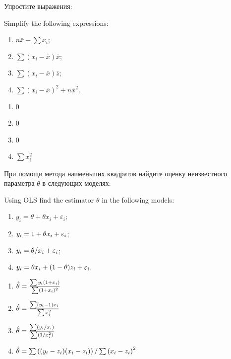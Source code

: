 \begin{problem}
\begin{translation-ru}
    Упростите выражения:    
\end{translation-ru}
\begin{translation-en}
    Simplify the following expressions:    
\end{translation-en}
\begin{enumerate}
\item $n\bar x - \sum x_i$;
\item $\sum (x_i - \bar x)\bar x$;
\item $\sum (x_i - \bar x)\bar z$;
\item $\sum (x_i - \bar x)^2 + n \bar{x}^2$.
\end{enumerate}

\begin{sol}
\begin{enumerate}
\item $0$
\item $0$
\item $0$
\item $\sum x_i^2$
\end{enumerate}
\end{sol}
\end{problem}


\begin{problem}
\begin{translation-ru}
    При помощи метода наименьших квадратов найдите оценку неизвестного параметра $\theta$ в следующих моделях:    
\end{translation-ru}
\begin{translation-en}
    Using OLS find the estimator $\theta$ in the following models:    
\end{translation-en}

\begin{enumerate}
\item $y_i = \theta + \theta x_i + \varepsilon_i$;
\item $y_i = 1 + \theta x_i + \varepsilon_i$;
\item $y_i = \theta / x_i + \varepsilon_i$;
\item $y_i = \theta x_i + (1-\theta)z_i+\varepsilon_i$.
\end{enumerate}

\begin{sol}
\begin{enumerate}
\item $\hat{\theta} = \frac{\sum y_i (1 + x_i)}{\sum (1 + x_i)^2}$
\item $\hat{\theta} = \frac{\sum (y_i - 1) x_i}{\sum x_i^2}$
\item $\hat{\theta} = \frac{\sum (y_i / x_i)}{\sum (1 / x_i^2)}$
\item $\hat{\theta} = \sum \left((y_i - z_i)(x_i - z_i) \right) / \sum \left(x_i - z_i\right)^2$
\end{enumerate}
\end{sol}
\end{problem}

